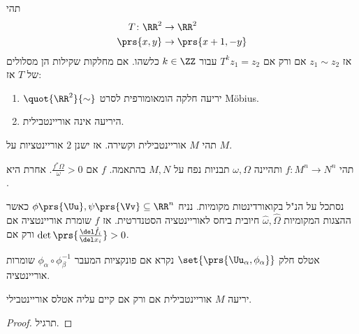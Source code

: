 \documentclass[a4paper,10pt,twoside,openany]{book}
\begin{document}
\begin{example}
תהי
\begin{align*}
T \colon \RR^2 &\to \RR^2 \\
\prs{x,y} &\to \prs{x+1, -y}
\end{align*}
אז
$z_1 \sim z_2$
אם ורק אם
$T^k z_1 = z_2$
עבור
$k \in \ZZ$
כלשהו.
אם מחלקות שקילות הן מסלולים של
$T$
אז:
\begin{exercise}
\begin{enumerate}
\item $\quot{\RR^2}{\sim}$
יריעה חלקה הומאומורפית לסרט
\textenglish{Möbius}.
\item היריעה אינה אוריינטבילית.
\end{enumerate}
\end{exercise}
\end{example}
\begin{exercise}
תהי
$M$
אוריינטבילית וקשירה. אז ישנן
$2$
אוריינטציות על
$M$.
\end{exercise}
\begin{definition}
תהי
$f \colon M^n \to N^n$
ותהיינה
$\omega, \Omega$
תבניות נפח על
$M, N$
בהתאמה.
$f$
אם
$\frac{f^* \Omega}{\omega} > 0$.
אחרת היא
.
\end{definition}
\begin{remark}
נסתכל
על הנ"ל
בקואורדינטות מקומיות.
נניח
$\phi\prs{\Uu}, \psi\prs{\Vv} \subseteq \RR^n$
כאשר ההצגות המקומיות
$\hat{\omega}, \hat{\Omega}$
חיובית ביחס לאוריינטציה הסטנדרטית.
אז
$f$
שומרת אוריינטציה אם ורק אם
$\det \prs{\frac{\del \hat{f_i}}{\del x_i}} > 0$.
\end{remark}

\begin{definition}
אטלס חלק
$\set{\prs{\Uu_{\alpha}, \phi_{\alpha}}}$
נקרא
אם פונקציות המעבר
$\phi_{\alpha} \circ \phi_{\beta}^{-1}$
שומרות אוריינטציה.
\end{definition}

\begin{theorem}
יריעה
$M$
אוריינטבילית אם ורק אם קיים עליה אטלס אוריינטבילי.
\end{theorem}
\begin{proof}
תרגיל.
\end{proof}
\end{document}
